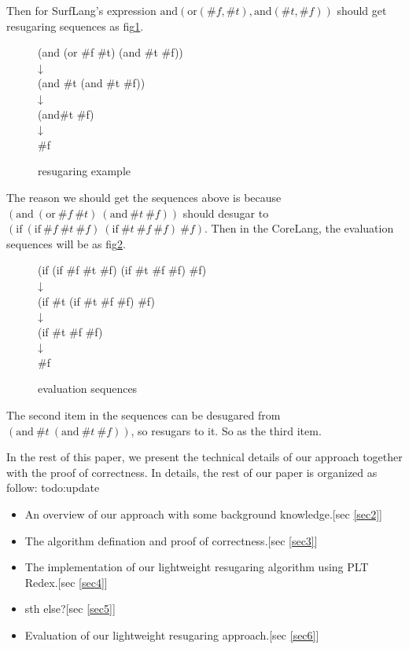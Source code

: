 Then for SurfLang's expression $\mbox{and}(\mbox{or}(\#f, \#t), \mbox{and}(\#t, \#f))$ should get resugaring sequences as fig\ref{fig:example}.

\begin{figure}[ht]
\parbox[t]{\textwidth}{
			\begin{center}  
				(and (or \#f \#t) (and \#t \#f))\\
				↓\\
				(and \#t (and \#t \#f))\\
				↓\\
				(and\#t \#f)\\
				↓\\
				\#f
			\end{center}  
		}
\caption{resugaring example}
\label{fig:example}
\end{figure}

The reason we should get the sequences above is because $(\mbox{and}~(\mbox{or}~\#f~\#t)~(\mbox{and}~\#t~\#f))$ should desugar to $(\mbox{if}~(\mbox{if}~\#f~\#t~\#f)~(\mbox{if}~\#t~\#f~\#f)~\#f)$. Then in the CoreLang, the evaluation sequences will be as fig\ref{fig:coreseq}.

\begin{figure}[ht]
\parbox[t]{\textwidth}{
			\begin{center}  
				(if (if \#f \#t \#f) (if \#t \#f \#f) \#f)\\
				↓\\
				(if \#t (if \#t \#f \#f) \#f)\\
				↓\\
				(if \#t \#f \#f)\\
				↓\\
				\#f
			\end{center}  
		}
\caption{evaluation sequences}
\label{fig:coreseq}
\end{figure}

The second item in the sequences can be desugared from $(\mbox{and}~\#t~(\mbox{and}~\#t~\#f))$, so resugars to it. So as the third item.

In the rest of this paper, we present the technical details of our approach together with the proof of correctness. In details, the rest of our paper is organized as follow: todo:update

\begin{itemize}
\item An overview of our approach with some background knowledge.[sec \ref{sec2}]
\item The algorithm defination and proof of correctness.[sec \ref{sec3}]
\item The implementation of our lightweight resugaring algorithm using PLT Redex.[sec \ref{sec4}]
\item sth else?[sec \ref{sec5}]
\item Evaluation of our lightweight resugaring approach.[sec \ref{sec6}]
\end{itemize}
